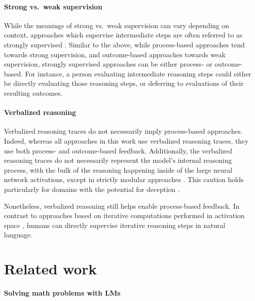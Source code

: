 \documentclass[11pt, a4paper, logo]{deepmind}
\begin{document}
{\paragraph{Strong vs.\ weak supervision}
While the meanings of strong vs.\ weak supervision can vary depending on context, approaches which supervise intermediate steps are often referred to as strongly supervised \citep{yang2018hotpotqa, perez2020unsupervised}.
Similar to the above, while process-based approaches tend towards strong supervision, and outcome-based approaches towards weak supervision, strongly supervised approaches can be either process- or outcome-based.
For instance, a person evaluating intermediate reasoning steps could either be directly evaluating those reasoning steps, or deferring to evaluations of their resulting outcomes.




\paragraph{Verbalized reasoning}
Verbalized reasoning traces do not necessarily imply process-based approaches. Indeed, whereas all approaches in this work use verbalized reasoning traces, they use both process- and outcome-based feedback. Additionally, the verbalized reasoning traces do not necessarily represent the model's internal reasoning process, with the bulk of the reasoning happening inside of the large neural network activations, except in strictly modular approaches \citep{creswell2022selection}. This caution holds particularly for domains with the potential for deception \citep{kenton2021alignment}.

Nonetheless, verbalized reasoning still helps enable process-based feedback.
In contrast to approaches based on iterative computations performed in activation space \citep{guez2019investigation, dehghani2018universal, graves2016adaptive, schrittwieser2020mastering}, humans can directly supervise iterative reasoning steps in natural language.


\section{Related work}
\label{sec:related_work}

\paragraph{Solving math problems with LMs}

}
\end{document}
